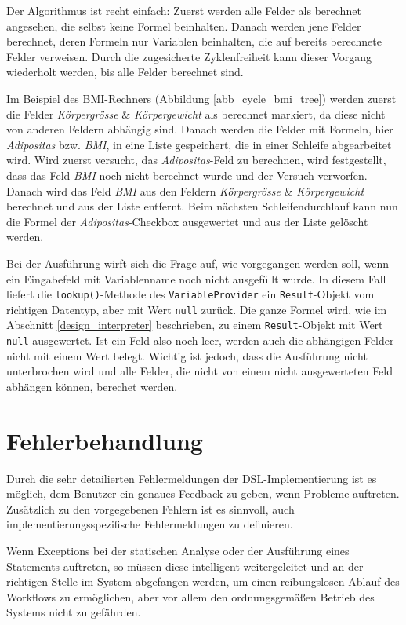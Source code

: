 Der Algorithmus ist recht einfach: Zuerst werden alle Felder als berechnet angesehen, die selbst keine Formel beinhalten. Danach werden jene Felder berechnet, deren Formeln nur Variablen beinhalten, die auf bereits berechnete Felder verweisen. Durch die zugesicherte Zyklenfreiheit kann dieser Vorgang wiederholt werden, bis alle Felder berechnet sind.

Im Beispiel des BMI-Rechners (Abbildung \ref{abb_cycle_bmi_tree}) werden zuerst die Felder \emph{Körpergrösse} \& \emph{Körpergewicht} als berechnet markiert, da diese nicht von anderen Feldern abhängig sind. Danach werden die Felder mit Formeln, hier \emph{Adipositas} bzw. \emph{BMI}, in eine Liste gespeichert, die in einer Schleife abgearbeitet wird. Wird zuerst versucht, das \emph{Adipositas}-Feld zu berechnen, wird festgestellt, dass das Feld \emph{BMI} noch nicht berechnet wurde und der Versuch verworfen. Danach wird das Feld \emph{BMI} aus den Feldern \emph{Körpergrösse} \& \emph{Körpergewicht} berechnet und aus der Liste entfernt. Beim nächsten Schleifendurchlauf kann nun die Formel der \emph{Adipositas}-Checkbox ausgewertet und aus der Liste gelöscht werden.

Bei der Ausführung wirft sich die Frage auf, wie vorgegangen werden soll, wenn ein Eingabefeld mit Variablenname noch nicht ausgefüllt wurde. In diesem Fall liefert die \texttt{lookup()}-Methode des \texttt{VariableProvider} ein \texttt{Result}-Objekt vom richtigen Datentyp, aber mit Wert \texttt{null} zurück. Die ganze Formel wird, wie im Abschnitt \ref{design_interpreter} beschrieben, zu einem \texttt{Result}-Objekt mit Wert \texttt{null} ausgewertet. Ist ein Feld also noch leer, werden auch die abhängigen Felder nicht mit einem Wert belegt. Wichtig ist jedoch, dass die Ausführung nicht unterbrochen wird und alle Felder, die nicht von einem nicht ausgewerteten Feld abhängen können, berechet werden.



\section{Fehlerbehandlung}
\label{integration_fehlerbehandlung}

Durch die sehr detailierten Fehlermeldungen der DSL-Implementierung ist es möglich, dem Benutzer ein genaues Feedback zu geben, wenn Probleme auftreten. Zu\-sätz\-lich zu den vorgegebenen Fehlern ist es sinnvoll, auch implementierungsspezifische Fehlermeldungen zu definieren.

Wenn Exceptions bei der statischen Analyse oder der Ausführung eines Statements auftreten, so müssen diese intelligent weitergeleitet und an der richtigen Stelle im System abgefangen werden, um einen reibungslosen Ablauf des Workflows zu ermöglichen, aber vor allem den ordnungsgemäßen Betrieb des Systems nicht zu gefährden.


